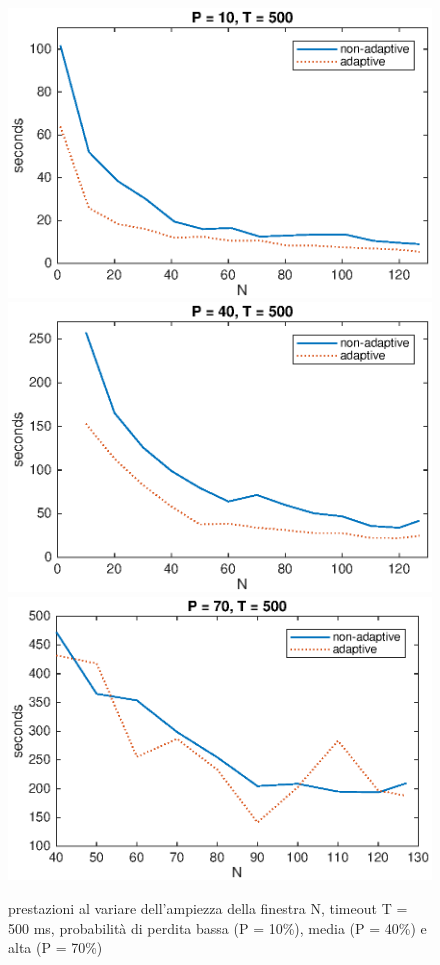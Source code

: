 \begin{figure}[!hp]
	\includegraphics[scale=0.5]{images/N_T500_P10}
	\includegraphics[scale=0.5]{images/N_T500_P40}
	\includegraphics[scale=0.5]{images/N_T500_P70}
	\caption{prestazioni al variare dell'ampiezza della finestra N,
			 timeout T = 500 ms, probabilità di perdita bassa (P = 10\%),
			 media (P = 40\%) e alta (P = 70\%)}
	\label{n1}
\end{figure}
